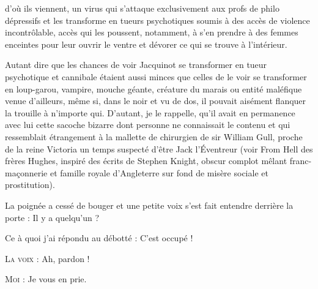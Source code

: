 d’où ils viennent, un virus qui s’attaque exclusivement aux profs de philo dépressifs et les transforme en tueurs psychotiques soumis à des accès de violence incontrôlable, accès qui les poussent, notamment, à s’en prendre à des femmes enceintes pour leur ouvrir le ventre et dévorer ce qui se trouve à l’intérieur.

%
Autant dire que les chances de voir Jacquinot se transformer en tueur psychotique et cannibale étaient aussi minces que celles de le voir se transformer en loup-garou, vampire, mouche géante, créature du marais ou entité maléfique venue d’ailleurs, même si, dans le noir et vu de dos, il pouvait aisément flanquer la trouille à n’importe qui. D’autant, je le rappelle, qu’il avait en permanence avec lui cette sacoche bizarre dont personne ne connaissait le contenu et qui ressemblait étrangement à la mallette de chirurgien de sir William Gull, proche de la reine Victoria un temps suspecté d’être Jack l’Éventreur (voir From Hell des frères Hughes, inspiré des écrits de Stephen Knight, obscur complot mêlant franc-maçonnerie et famille royale d’Angleterre sur fond de misère sociale et prostitution).


\begin{dialogue}
    
La poignée a cessé de bouger et une petite voix s’est fait entendre derrière la porte : Il y a quelqu’un ?

Ce à quoi j’ai répondu au débotté : C’est occupé !

\textsc{La voix} : Ah, pardon !

\textsc{Moi} : Je vous en prie.

\end{dialogue}

